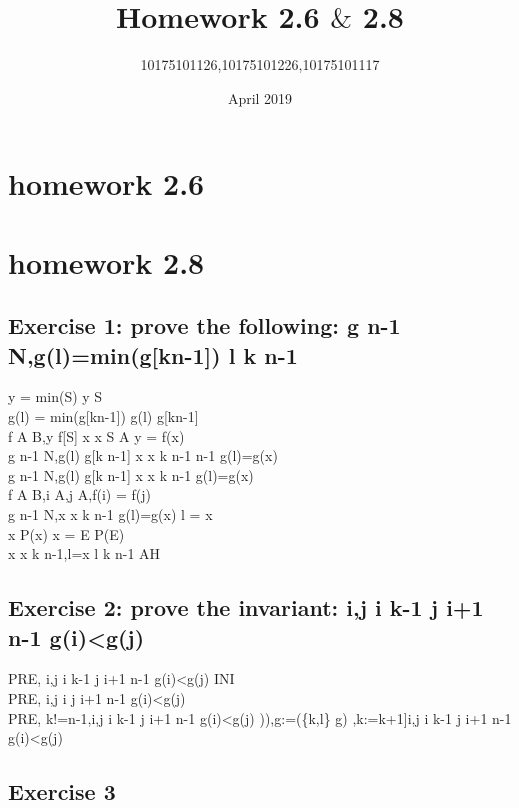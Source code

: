 \documentclass[11pt,a4paper,fleqn]{article}
\title{Homework 2.6 $\&$ 2.8}
\author{10175101126,10175101226,10175101117}
\date{April 2019}
\begin{document}
\maketitle

\section{ homework 2.6 }

\section{homework 2.8}

\subsection{Exercise 1: prove the following:  g  \upto n-1 \rightarrow N,g(l)=min(g[k\upto n-1]) \vdash l \in k \upto n-1} 
\noindent
y = min(S) \vdash y \in S \\
g(l) = min(g[k\upto n-1]) \vdash g(l) \in g[k\upto n-1] \\
f \in A \rightarrow B,y \in f[S] \vdash \exists x \cdot x \in S \cap A \wedge y = f(x) \\
g  \upto n-1 \rightarrow N,g(l) \in g[k \upto n-1] \vdash \exists x \cdot x \in k \upto n-1  \upto n-1 \wedge g(l)=g(x) \\
g  \upto n-1 \rightarrow N,g(l) \in g[k \upto n-1] \vdash \exists x \cdot x \in k \upto n-1 \wedge g(l)=g(x) \\
f \in A \rightarrowtail B,i \in A,j \in A,f(i) = f(j) \\
g  \upto n-1 \rightarrow N,\exists x \cdot x \in k \upto n-1 \wedge g(l)=g(x) \vdash l = x \\
\exists x \cdot P(x) \wedge x = E \vdash P(E) \\
\exists x \cdot x \in k \upto n-1,l=x \vdash l \in k \upto n-1 \; AH \\

\subsection{Exercise 2: prove the invariant: \forall i,j \cdot i  \upto k-1 \wedge j \in i+1 \upto n-1 \Rightarrow g(i)<g(j)}
\noindent
PRE, \vdash [k:=0]\forall i,j \cdot i  \upto k-1 \wedge j \in i+1 \upto n-1 \Rightarrow g(i)<g(j) \; INI \\
PRE, \vdash \forall i,j \cdot i   \wedge j \in i+1 \upto n-1 \Rightarrow g(i)<g(j) \\
PRE, k!=n-1,\forall i,j \cdot i  \upto k-1 \wedge j \in i+1 \upto n-1 \Rightarrow g(i)<g(j) \vdash [l:=g^{-1}(min(g[k\upto n-1])),g:=(\{k,l\} \domsub g) ,k:=k+1]\forall i,j \cdot i  \upto k-1 \wedge j \in i+1 \upto n-1 \Rightarrow g(i)<g(j) \\
\subsection{Exercise 3}








%
%
\end{document}
